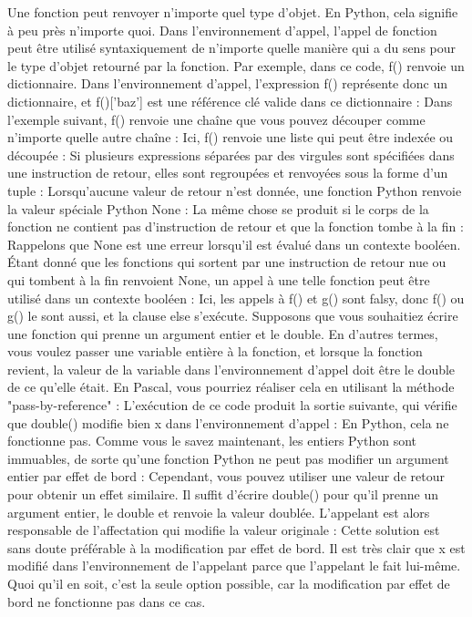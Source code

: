 Une fonction peut renvoyer n'importe quel type d'objet. En Python, cela signifie à peu près n'importe quoi. Dans l'environnement d'appel, l'appel de fonction peut être utilisé syntaxiquement de n'importe quelle manière qui a du sens pour le type d'objet retourné par la fonction.
Par exemple, dans ce code, f() renvoie un dictionnaire.  Dans l'environnement d'appel, l'expression f() représente donc un dictionnaire, et f()['baz'] est une référence clé valide dans ce dictionnaire :
Dans l'exemple suivant, f() renvoie une chaîne que vous pouvez découper comme n'importe quelle autre chaîne :
Ici, f() renvoie une liste qui peut être indexée ou découpée :
Si plusieurs expressions séparées par des virgules sont spécifiées dans une instruction de retour, elles sont regroupées et renvoyées sous la forme d'un tuple :
Lorsqu'aucune valeur de retour n'est donnée, une fonction Python renvoie la valeur spéciale Python None :
La même chose se produit si le corps de la fonction ne contient pas d'instruction de retour et que la fonction tombe à la fin :
Rappelons que None est une erreur lorsqu'il est évalué dans un contexte booléen.
Étant donné que les fonctions qui sortent par une instruction de retour nue ou qui tombent à la fin renvoient None, un appel à une telle fonction peut être utilisé dans un contexte booléen :
Ici, les appels à f() et g() sont falsy, donc f() ou g() le sont aussi, et la clause else s'exécute.
Supposons que vous souhaitiez écrire une fonction qui prenne un argument entier et le double.  En d'autres termes, vous voulez passer une variable entière à la fonction, et lorsque la fonction revient, la valeur de la variable dans l'environnement d'appel doit être le double de ce qu'elle était. En Pascal, vous pourriez réaliser cela en utilisant la méthode "pass-by-reference" :
L'exécution de ce code produit la sortie suivante, qui vérifie que double() modifie bien x dans l'environnement d'appel :
En Python, cela ne fonctionne pas.  Comme vous le savez maintenant, les entiers Python sont immuables, de sorte qu'une fonction Python ne peut pas modifier un argument entier par effet de bord :
Cependant, vous pouvez utiliser une valeur de retour pour obtenir un effet similaire. Il suffit d'écrire double() pour qu'il prenne un argument entier, le double et renvoie la valeur doublée.  L'appelant est alors responsable de l'affectation qui modifie la valeur originale :
Cette solution est sans doute préférable à la modification par effet de bord.  Il est très clair que x est modifié dans l'environnement de l'appelant parce que l'appelant le fait lui-même. Quoi qu'il en soit, c'est la seule option possible, car la modification par effet de bord ne fonctionne pas dans ce cas.
